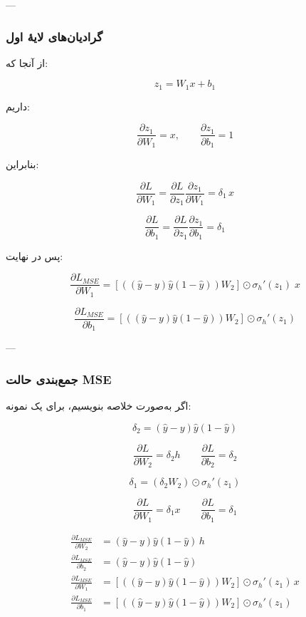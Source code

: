 \documentclass[12pt,a4paper]{article}
\begin{document}
---

\subsubsection{گرادیان‌های لایهٔ اول}

از آنجا که:

\[
z_1=W_1x+b_1
\]

داریم:

\[
\frac{\partial z_1}{\partial W_1}=x,
\qquad
\frac{\partial z_1}{\partial b_1}=1
\]

بنابراین:

\[
\frac{\partial L}{\partial W_1}
=
\frac{\partial L}{\partial z_1}
\frac{\partial z_1}{\partial W_1}
=
\delta_1\,x
\]

\[
\frac{\partial L}{\partial b_1}
=
\frac{\partial L}{\partial z_1}
\frac{\partial z_1}{\partial b_1}
=
\delta_1
\]

پس در نهایت:

\[
\boxed{
	\frac{\partial L_{MSE}}{\partial W_1}
	=
	\left[\left((\hat{y}-y)\hat{y}(1-\hat{y})\right)W_2\right]
	\odot \sigma_h'(z_1)\; x
}
\]

\[
\boxed{
	\frac{\partial L_{MSE}}{\partial b_1}
	=
	\left[\left((\hat{y}-y)\hat{y}(1-\hat{y})\right)W_2\right]
	\odot \sigma_h'(z_1)
}
\]

---

\subsubsection{جمع‌بندی حالت MSE}

اگر به‌صورت خلاصه بنویسیم، برای یک نمونه:

\[
\delta_2 = (\hat{y}-y)\hat{y}(1-\hat{y})
\]

\[
\frac{\partial L}{\partial W_2}=\delta_2 h
\qquad
\frac{\partial L}{\partial b_2}=\delta_2
\]

\[
\delta_1=(\delta_2 W_2)\odot \sigma_h'(z_1)
\]

\[
\frac{\partial L}{\partial W_1}=\delta_1 x
\qquad
\frac{\partial L}{\partial b_1}=\delta_1
\]

\begin{tcolorbox}[colback=softgray,colframe=mainblue,title=فرم نهایی MSE]
	\[
	\boxed{
		\begin{aligned}
			\frac{\partial L_{MSE}}{\partial W_2} &= (\hat{y}-y)\hat{y}(1-\hat{y})\,h \\
			\frac{\partial L_{MSE}}{\partial b_2} &= (\hat{y}-y)\hat{y}(1-\hat{y}) \\
			\frac{\partial L_{MSE}}{\partial W_1} &= \left[\left((\hat{y}-y)\hat{y}(1-\hat{y})\right)W_2\right]\odot \sigma_h'(z_1)\,x \\
			\frac{\partial L_{MSE}}{\partial b_1} &= \left[\left((\hat{y}-y)\hat{y}(1-\hat{y})\right)W_2\right]\odot \sigma_h'(z_1)
		\end{aligned}
	}
	\]
\end{tcolorbox}
\end{document}
